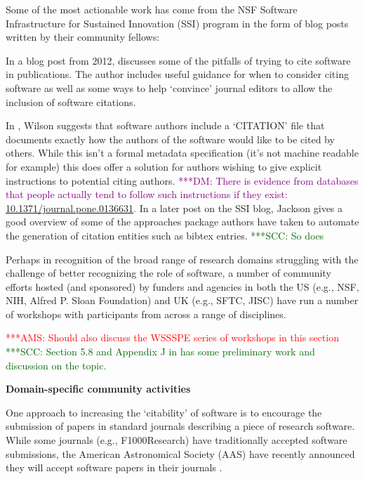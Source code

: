 \documentclass[11pt, oneside]{amsart}
\newcommand{\asnote}[1]{ {\textcolor{red} { ***AMS: #1 }}}
\newcommand{\scnote}[1]{ {\textcolor{darkgreen} { ***SCC: #1 }}} %
\newcommand{\dmnote}[1]{ {\textcolor{purple} { ***DM: #1 }}} %
\begin{document}
Some of the most actionable work has come from the NSF Software Infrastructure for Sustained Innovation (SSI) program in the form of blog posts written by their community fellows:

In a blog post from 2012, \cite{ssi-how-to-cite} discusses some of the pitfalls of trying to cite software in publications.
The author includes useful guidance for when to consider citing software as well as some ways to help `convince' journal editors
to allow the inclusion of software citations.

In \cite{ssi-citation-files}, Wilson suggests that software authors include a `CITATION' file that documents exactly how the
authors of the software would like to be cited by others. While this isn't a formal metadata specification (it's not machine
readable for example) this does offer a solution for authors wishing to give explicit instructions to potential citing authors.\dmnote{There is evidence from databases that people actually tend to follow such instructions if they exist: \href{http://doi.org/10.1371/journal.pone.0136631}{10.1371/journal.pone.0136631}.}
In a later post on the SSI blog, Jackson \cite{ssi-how-shalt-i-cite-thee} gives a good overview of some of the approaches
package authors have taken to automate the generation of citation entities such as bibtex entries.
\scnote{So does \cite{knepley2013accurately}}

Perhaps in recognition of the broad range of research domains struggling with
the challenge of better recognizing the role of software, a number of community
efforts hosted (and sponsored) by funders and agencies in both the US (e.g., NSF,
NIH, Alfred P. Sloan Foundation) and UK (e.g., SFTC, JISC) have run a number of
workshops with participants from across a range of disciplines.

\asnote{Should also discuss the WSSSPE \cite{wssspe} series of workshops in this section}
\scnote{Section 5.8 and Appendix J in \cite{WSSSPE3} has some preliminary work and discussion on the topic.}

\textbf{Domain-specific community activities}

One approach to increasing the `citability' of software is to encourage the
submission of papers in standard journals describing a piece of research
software. While some journals (e.g., F1000Research) have traditionally accepted
software submissions, the American Astronomical Society (AAS) have recently
announced they will accept software papers in their journals
\cite{aas-sofware-papers}.
\end{document}
